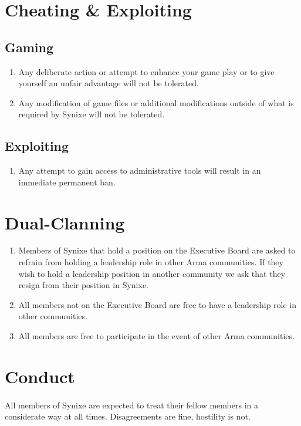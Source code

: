 \documentclass[10pt,a4paper]{article}
\begin{document}
\section{Cheating \& Exploiting} \label{cheating}
\subsection{Gaming}
\begin{enumerate}
	\item Any deliberate action or attempt to enhance your game play or to give yourself an unfair advantage will not be tolerated.
	\item Any modification of game files or additional modifications outside of what is required by Synixe will not be tolerated.
\end{enumerate}
\subsection{Exploiting}
\begin{enumerate}
	\item Any attempt to gain access to administrative tools will result in an immediate permanent ban.
\end{enumerate}
\section{Dual-Clanning} \label{dual-clan}
\begin{enumerate}
	\item Members of Synixe that hold a position on the Executive Board are asked to refrain from holding a leadership role in other Arma communities. If they wish to hold a leadership position in another community we ask that they resign from their position in Synixe.
	\item All members not on the Executive Board are free to have a leadership role in other communities.
	\item All members are free to participate in the event of other Arma communities.
\end{enumerate}
\section{Conduct} \label{conduct}
\paragraph{}
All members of Synixe are expected to treat their fellow members in a considerate way at all times. Disagreements are fine, hostility is not.
\end{document}
